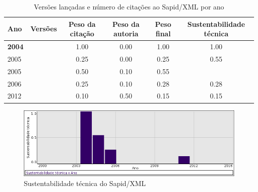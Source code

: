 \begin{table}[H]
\caption{Versões lançadas e número de citações ao Sapid/XML por ano}
\centering
\begin{tabular}{| l | c | c | c | c | c |}
  \hline
  Ano & Versões & Peso da citação & Peso da autoria & Peso final & Sustentabilidade técnica \\
  \hline
            {\bf 2004}
          &
          
          &
          1.00
          &
          0.00
          &
          1.00
          &
            {\color{blue} 1.00}
          \\
\hline
            2005
          &
          
          &
          0.25
          &
          0.00
          &
          0.25
          &
            {\color{blue} 0.55}
          \\
            2005
          &
          
          &
          0.50
          &
          0.10
          &
          0.55
          &
          \\
\hline
            2006
          &
          
          &
          0.25
          &
          0.10
          &
          0.28
          &
            {\color{red} 0.28}
          \\
\hline
            2012
          &
          
          &
          0.10
          &
          0.50
          &
          0.15
          &
            {\color{red} 0.15}
          \\
\hline
\end{tabular}
\end{table}

\begin{figure}[h]
  \center
  \includegraphics[scale=0.50]{imagens/softwares-charts/sapid-xml.png}
  \caption{Sustentabilidade técnica do Sapid/XML}
\end{figure}


